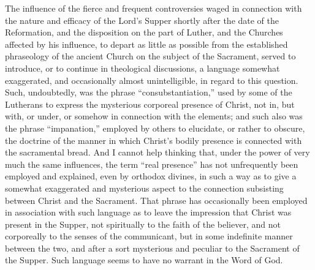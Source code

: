\documentclass[]{book}
\begin{document}
The influence of the fierce and frequent controversies waged in connection with the nature and efficacy of the Lord's Supper shortly after the date of the Reformation, and the disposition on the part of Luther, and the Churches affected by his influence, to depart as little as possible from the established phraseology of the ancient Church on the subject of the Sacrament, served to introduce, or to continue in theological discussions, a language somewhat exaggerated, and occasionally almost unintelligible, in regard to this question. Such, undoubtedly, was the phrase ``consubstantiation,'' used by some of the Lutherans to express the mysterious corporeal presence of Christ, not in, but with, or under, or somehow in connection with the elements; and such also was the phrase ``impanation,'' employed by others to elucidate, or rather to obscure, the doctrine of the manner in which Christ's bodily presence is connected with the sacramental bread. And I cannot help thinking that, under the power of very much the same influences, the term ``real presence'' has not unfrequently been employed and explained, even by orthodox divines, in such a way as to give a somewhat exaggerated and mysterious aspect to the connection subsisting between Christ and the Sacrament. That phrase has occasionally been employed in association with such language as to leave the impression that Christ was present in the Supper, not spiritually to the faith of the believer, and not corporeally to the senses of the communicant, but in some indefinite manner between the two, and after a sort mysterious and peculiar to the Sacrament of the Supper. Such language seems to have no warrant in the Word of God.
\end{document}
